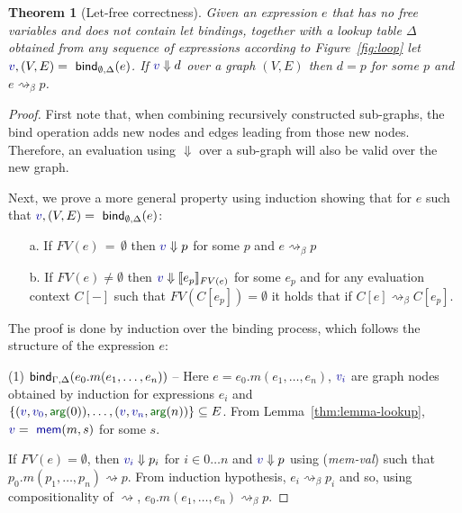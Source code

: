 \documentclass[sigplan,10pt]{acmart}\settopmatter{printfolios=true,printccs=false,printacmref=false}
\newcounter{thc}
\theoremstyle{plain}
\newtheorem{theorem}[thc]{Theorem}
\theoremstyle{definition}
\newcommand{\ident}[1]{\textnormal{\sffamily #1}}
\newcommand{\bndclr}[1]{\textcolor{kvdclr}{#1}}
\newcommand{\bnd}[1]{\textnormal{\textcolor{kvdclr}{\sffamily #1}}}
\newcommand{\blbl}[1]{\textnormal{\textcolor{numclr}{\sffamily #1}}}
\begin{document}
\setcounter{thc}{-1}
\begin{theorem}[Let-free correctness]
Given an expression $e$ that has no free variables and does not contain let bindings, together
with a lookup table $\Delta$ obtained from any sequence of expressions according to Figure~\ref{fig:loop}
let $\bndclr{v}, (V, E) = \ident{bind}_{\emptyset, \Delta}(e)$. If $\bndclr{v}\Downarrow d$ 
over a graph $(V, E)$ then $d = p$ for some $p$ and $e \rightsquigarrow_\beta p$.
\end{theorem}
\begin{proof}
First note that, when combining recursively constructed sub-graphs, the \ident{bind} operation
adds new nodes and edges leading from those new nodes. Therefore, an evaluation using $\Downarrow$
over a sub-graph will also be valid over the new graph.

Next, we prove a more general property using induction showing that for $e$ such 
that $\bndclr{v}, (V, E) = \ident{bind}_{\emptyset, \Delta}(e)$:
\begin{enumerate}
\item[a.] If $FV(e)\,=\,\emptyset$ then $\bndclr{v} \Downarrow p$ for some $p$ and $e \rightsquigarrow_\beta p$
\item[b.] If $FV(e)\neq\emptyset$ then $\bndclr{v} \Downarrow \llbracket e_p \rrbracket_{FV(e)}$ for some $e_p$ and
  for any evaluation context $C[-]$ such that $FV(C[e_p])=\emptyset$ it holds that if
  $C[e] \rightsquigarrow_\beta C[e_p]$.  
\end{enumerate}

The proof is done by induction over the binding process, which follows the structure 
of the expression $e$:

\vspace{0.75em}\noindent(1) $\ident{bind}_{\Gamma, \Delta}(e_0.m(e_1, \ldots, e_n))$ -- 
  Here $e = e_0.m(e_1, \ldots, e_n)$, $\bndclr{v_i}$ are graph nodes obtained by induction for
  expressions $e_i$ and $\{ (\bndclr{v}, \bndclr{v_0}, \blbl{arg}(0)), \ldots, (\bndclr{v}, \bndclr{v_n}, \blbl{arg}(n))\} \subseteq E$.
  From Lemma~\ref{thm:lemma-lookup}, $\bndclr{v} = \bnd{mem}(m, s)$ for some $s$.
  
  If $FV(e)=\emptyset$, then $\bndclr{v_i} \Downarrow p_i$ for $i\in 0\ldots n$ and 
  $\bndclr{v}\Downarrow p$ using (\emph{mem-val}) such that $p_0.m(p_1, \ldots, p_n) \rightsquigarrow p$. 
  From induction hypothesis, $e_i \rightsquigarrow_\beta p_i$ and so, using compositionality of $\rightsquigarrow$, 
  $e_0.m(e_1, \ldots, e_n) \rightsquigarrow_\beta p$.
  

\end{proof}
\end{document}
